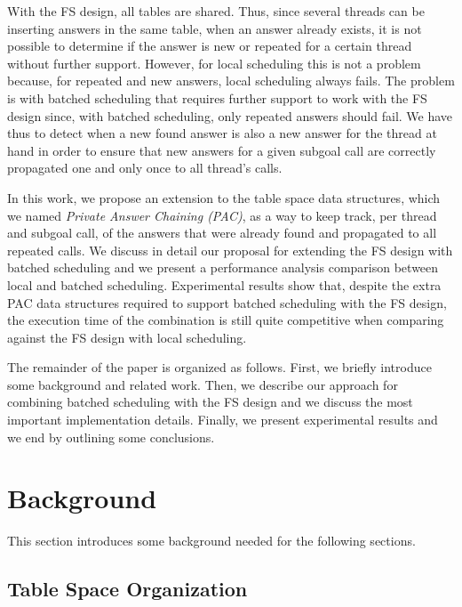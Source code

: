 \documentclass{llncs}
\begin{document}
With the FS design, all tables are shared. Thus, since several threads
can be inserting answers in the same table, when an answer already
exists, it is not possible to determine if the answer is new or
repeated for a certain thread without further support. However, for
local scheduling this is not a problem because, for repeated and new
answers, local scheduling always fails. The problem is with batched
scheduling that requires further support to work with the FS design
since, with batched scheduling, only repeated answers should fail. We
have thus to detect when a new found answer is also a new answer for
the thread at hand in order to ensure that new answers for a given
subgoal call are correctly propagated one and only once to all
thread's calls.
 
In this work, we propose an extension to the table space data
structures, which we named \emph{Private Answer Chaining (PAC)}, as a
way to keep track, per thread and subgoal call, of the answers that
were already found and propagated to all repeated calls. We discuss in
detail our proposal for extending the FS design with batched
scheduling and we present a performance analysis comparison between
local and batched scheduling. Experimental results show that, despite
the extra PAC data structures required to support batched scheduling
with the FS design, the execution time of the combination is still
quite competitive when comparing against the FS design with local
scheduling.

The remainder of the paper is organized as follows. First, we briefly
introduce some background and related work. Then, we describe our
approach for combining batched scheduling with the FS design and we
discuss the most important implementation details. Finally, we present
experimental results and we end by outlining some conclusions.


\section{Background}

This section introduces some background needed for the following
sections. 


\subsection{Table Space Organization}
\end{document}
